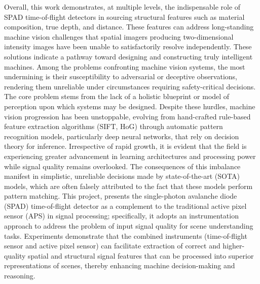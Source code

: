 \documentclass[12pt,a4paper,oneside]{report}
\begin{document}
Overall, this work demonstrates, at multiple levels, the indispensable role of SPAD time-of-flight detectors in sourcing structural features such as material composition, true depth, and distance. These features can address long-standing machine vision challenges that spatial imagers producing two-dimensional intensity images have been unable to satisfactorily resolve independently. These solutions indicate a pathway toward designing and constructing truly intelligent machines. Among the problems confronting machine vision systems, the most undermining is their susceptibility to adversarial or deceptive observations, rendering them unreliable under circumstances requiring safety-critical decisions. The core problem stems from the lack of a holistic blueprint or model of perception upon which systems may be designed. Despite these hurdles, machine vision progression has been unstoppable, evolving from hand-crafted rule-based feature extraction algorithms (SIFT, HoG) through automatic pattern recognition models, particularly deep neural networks, that rely on decision theory for inference. Irrespective of rapid growth, it is evident that the field is experiencing greater advancement in learning architectures and processing power while signal quality remains overlooked. The consequences of this imbalance manifest in simplistic, unreliable decisions made by state-of-the-art (SOTA) models, which are often falsely attributed to the fact that these models perform pattern matching. This project, presents the single-photon avalanche diode (SPAD) time-of-flight detector as a complement to the traditional active pixel sensor (APS) in signal processing; specifically, it adopts an instrumentation approach to address the problem of input signal quality for scene understanding tasks. Experiments demonstrate that the combined instruments (time-of-flight sensor and active pixel sensor) can facilitate extraction of correct and higher-quality spatial and structural signal features that can be processed into superior representations of scenes, thereby enhancing machine decision-making and reasoning.
\end{document}
